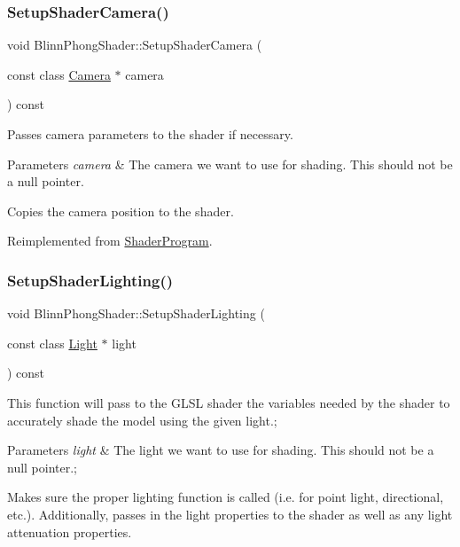 \subsubsection{\texorpdfstring{Setup\+Shader\+Camera()}{SetupShaderCamera()}}
{\footnotesize\ttfamily void Blinn\+Phong\+Shader\+::\+Setup\+Shader\+Camera (\begin{DoxyParamCaption}\item[{const class \hyperlink{class_camera}{Camera} $\ast$}]{camera }\end{DoxyParamCaption}) const\hspace{0.3cm}{\ttfamily [virtual]}}



Passes camera parameters to the shader if necessary.


\begin{DoxyParams}{Parameters}
{\em camera} & The camera we want to use for shading. This should not be a null pointer.\\
\hline
\end{DoxyParams}
Copies the camera position to the shader.

Reimplemented from \hyperlink{class_shader_program_abefd4e66aae75993f05bd607b6b0ed22}{Shader\+Program}.

\hypertarget{class_blinn_phong_shader_a812ffd751068ae3bfc131ddb27712941}{}\label{class_blinn_phong_shader_a812ffd751068ae3bfc131ddb27712941}
\subsubsection{\texorpdfstring{Setup\+Shader\+Lighting()}{SetupShaderLighting()}}
{\footnotesize\ttfamily void Blinn\+Phong\+Shader\+::\+Setup\+Shader\+Lighting (\begin{DoxyParamCaption}\item[{const class \hyperlink{class_light}{Light} $\ast$}]{light }\end{DoxyParamCaption}) const\hspace{0.3cm}{\ttfamily [virtual]}}



This function will pass to the G\+L\+SL shader the variables needed by the shader to accurately shade the model using the given light.;


\begin{DoxyParams}{Parameters}
{\em light} & The light we want to use for shading. This should not be a null pointer.;\\
\hline
\end{DoxyParams}
Makes sure the proper lighting function is called (i.\+e. for point light, directional, etc.). Additionally, passes in the light properties to the shader as well as any light attenuation properties.

